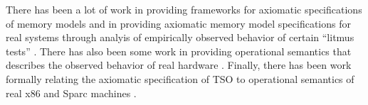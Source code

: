 
There has been a lot of work in providing frameworks for axiomatic
specifications of memory models \cite{alglave2012formal,alglave2014herding}
and in providing axiomatic memory model specifications for real systems
through analyis of empirically observed behavior of certain ``litmus tests''
\cite{mador2012axiomatic,sarkar2012synchronising}. There has also been some
work in providing operational semantics that describes the observed behavior of
real hardware \cite{sarkar2011understanding}. Finally, there has been work
formally relating the axiomatic specification of TSO to operational semantics
of real x86 and Sparc machines \cite{x86tsocacm10}.

%




